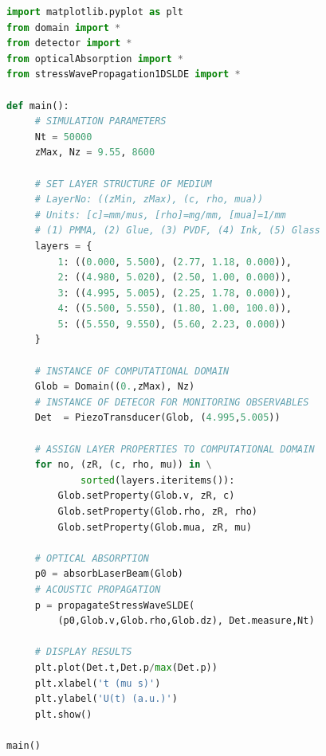 \documentclass[5p,times,twocolumn]{elsarticle}
\begin{document}
\begin{lstlisting}[float,captionpos=b, keywordstyle=\bf, frame=lines, language=Python,basicstyle=\ttfamily\scriptsize, 
caption={Implementation of the examplary application discussed in the sec.\
\ref{sec:S3}, contained in {\tt{python}} script file
{\tt{main\_InkOnGlass\_Fig2a.py}}.  Given that the imported modules are in the
local searchpath, the script produces output similar to Fig.\,
\ref{fig:pzt}(a)}, label=code:numExp]
import matplotlib.pyplot as plt
from domain import *
from detector import *
from opticalAbsorption import *
from stressWavePropagation1DSLDE import *

def main():
     # SIMULATION PARAMETERS 
     Nt = 50000
     zMax, Nz = 9.55, 8600        

     # SET LAYER STRUCTURE OF MEDIUM
     # LayerNo: ((zMin, zMax), (c, rho, mua))
     # Units: [c]=mm/mus, [rho]=mg/mm, [mua]=1/mm
     # (1) PMMA, (2) Glue, (3) PVDF, (4) Ink, (5) Glass
     layers = {
         1: ((0.000, 5.500), (2.77, 1.18, 0.000)), 
         2: ((4.980, 5.020), (2.50, 1.00, 0.000)), 
         3: ((4.995, 5.005), (2.25, 1.78, 0.000)), 
         4: ((5.500, 5.550), (1.80, 1.00, 100.0)), 
         5: ((5.550, 9.550), (5.60, 2.23, 0.000))  
     }

     # INSTANCE OF COMPUTATIONAL DOMAIN
     Glob = Domain((0.,zMax), Nz)
     # INSTANCE OF DETECOR FOR MONITORING OBSERVABLES
     Det  = PiezoTransducer(Glob, (4.995,5.005))

     # ASSIGN LAYER PROPERTIES TO COMPUTATIONAL DOMAIN
     for no, (zR, (c, rho, mu)) in \
             sorted(layers.iteritems()):
         Glob.setProperty(Glob.v, zR, c) 
         Glob.setProperty(Glob.rho, zR, rho)                 
         Glob.setProperty(Glob.mua, zR, mu)
     
     # OPTICAL ABSORPTION
     p0 = absorbLaserBeam(Glob)
     # ACOUSTIC PROPAGATION
     p = propagateStressWaveSLDE(
         (p0,Glob.v,Glob.rho,Glob.dz), Det.measure,Nt)

     # DISPLAY RESULTS 
     plt.plot(Det.t,Det.p/max(Det.p))
     plt.xlabel('t (mu s)')
     plt.ylabel('U(t) (a.u.)')
     plt.show()

main()
\end{lstlisting}
\end{document}

